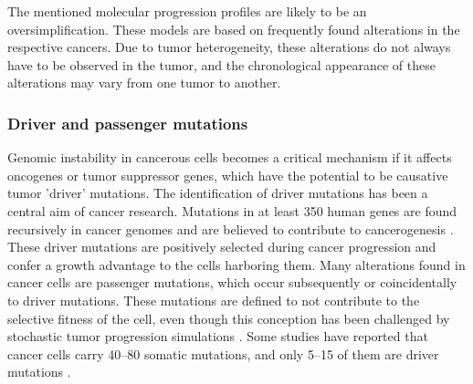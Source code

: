     The mentioned molecular progression profiles are likely to be an
    oversimplification. These models are based on frequently found alterations
    in the respective cancers. Due to tumor heterogeneity, these alterations do
    not always have to be observed in the tumor, and the chronological
    appearance of these alterations may vary from one tumor to another.

    \subsubsection{Driver and passenger mutations}

      Genomic instability in cancerous cells becomes a critical mechanism if it
      affects oncogenes or tumor suppressor genes, which have the potential to
      be causative tumor 'driver' mutations. The identification of driver
      mutations has been a central aim of cancer research. Mutations in at least
      350 human genes are found recursively in cancer genomes and are believed
      to contribute to cancerogenesis {\cite{cancer_genome}}. These driver
      mutations are positively selected during cancer progression and confer a
      growth advantage to the cells harboring them. Many alterations found in
      cancer cells are passenger mutations, which occur subsequently or
      coincidentally to driver mutations. These mutations are defined to not
      contribute to the selective fitness of the cell, even though this
      conception has been challenged by stochastic tumor progression simulations
      {\cite{stochastic_cancer}}. Some studies have reported that cancer cells
      carry 40--80 somatic mutations, and only 5--15 of them are driver
      mutations {\cite{som_mut}}.

